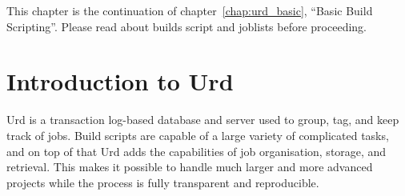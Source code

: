 
\label{chap:urd}

This chapter is the continuation of chapter~\ref{chap:urd_basic},
``Basic Build Scripting''.  Please read about builds script and
joblists before proceeding.



\section{Introduction to Urd}

Urd is a transaction log-based database and server used to group, tag,
and keep track of jobs.  Build scripts are capable of a large variety
of complicated tasks, and on top of that Urd adds the capabilities of
job organisation, storage, and retrieval.  This makes it possible to
handle much larger and more advanced projects while the process is
fully transparent and reproducible.

